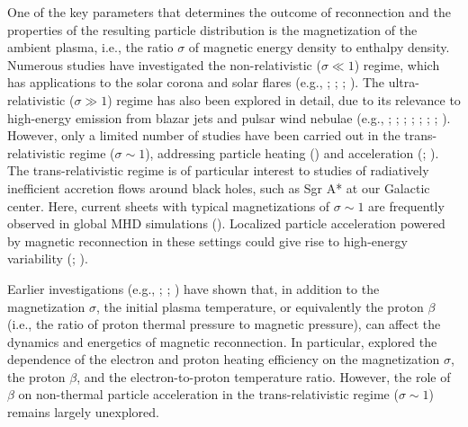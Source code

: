 One of the key parameters that determines the outcome of reconnection and the properties of the resulting particle distribution is the  magnetization of the ambient plasma, i.e., the ratio $\sigma$ of magnetic energy density to enthalpy density. 
Numerous studies have investigated the non-relativistic ($\sigma\ll 1$) regime, which has applications to the solar corona and solar flares (e.g., \citealt{drake2013}; \citealt{dahlin2014}; \citealt{shay2014}; \citealt{liguo2015}).  The ultra-relativistic ($\sigma\gg 1$) regime has also been explored in detail, due to its relevance to high-energy emission from blazar jets and pulsar wind nebulae (e.g., \citealt{kagan2013}; \citealt{sironi2014}; \citealt{guod_14, guo2015, guo_16}; \citealt{melzani2014}; \citealt{kagan2015}; \citealt{nalewajko2015}; \citealt{werner2016}; \citealt{sironi2016}).  However, only a limited number of studies have been carried out in the trans-relativistic regime ($\sigma \sim 1$), addressing particle heating (\citealt{rowan2017}) and acceleration (\citealt{melzani2014b}; \citealt{werner2018}). The trans-relativistic regime is of particular interest to studies of radiatively inefficient accretion flows around black holes, such as Sgr A* at our Galactic center. Here, current sheets with typical magnetizations of $\sigma\sim1$ are frequently observed in global MHD simulations (\citealt{ball2017}).  Localized particle acceleration powered by magnetic reconnection in these settings could give rise to high-energy variability (\citealt{ball2016}; \citealt{li2017}).  

Earlier investigations (e.g., \citealt{schoeffler2011}; \citealt{schoeffler2013}; \citealt{rowan2017}) have shown that, in addition to the magnetization $\sigma$, the initial plasma temperature, or equivalently the proton $\beta$ (i.e., the ratio of proton thermal pressure to magnetic pressure), can affect the dynamics and energetics of magnetic reconnection.  In particular, \citet{rowan2017} explored the dependence of the electron and proton heating efficiency on the magnetization $\sigma$, the proton $\beta$, and the electron-to-proton temperature ratio.  However, the role of $\beta$ on non-thermal particle acceleration in the trans-relativistic regime ($\sigma\sim1$) remains largely unexplored. 

